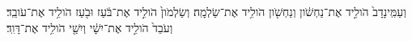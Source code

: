 \documentclass{openreader}
\begin{document}
וְעַמִּֽינָדָב֙ הֹולִ֣יד אֶת־נַחְשֹׁ֔ון וְנַחְשֹׁ֖ון הֹולִ֥יד אֶת־שַׂלְמָֽה׃ 
וְשַׂלְמֹון֙ הֹולִ֣יד אֶת־בֹּ֔עַז וּבֹ֖עַז הֹולִ֥יד אֶת־עֹובֵֽד׃ 
וְעֹבֵד֙ הֹולִ֣יד אֶת־יִשָׁ֔י וְיִשַׁ֖י הֹולִ֥יד אֶת־דָּוִֽד׃ 
\end{document}
